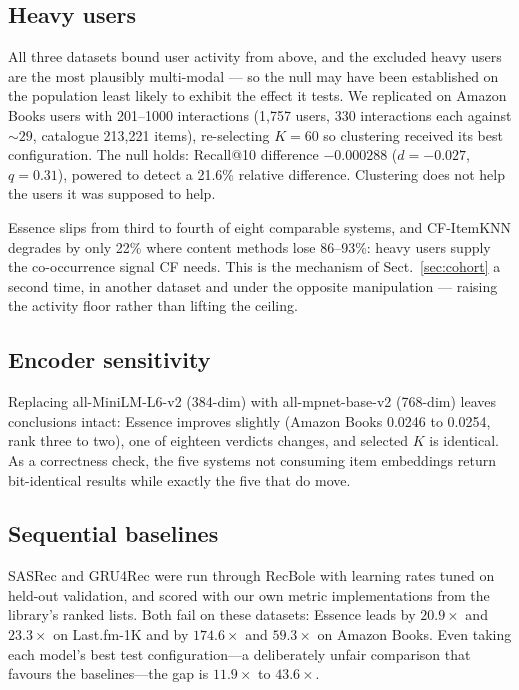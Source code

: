 \documentclass[runningheads,a4paper]{llncs}
\begin{document}
\subsection{Heavy users}\label{sec:heavy}

All three datasets bound user activity from above, and the excluded heavy users are the most
plausibly multi-modal --- so the null may have been established on the population least
likely to exhibit the effect it tests. We replicated on Amazon Books users with 201--1000
interactions (1{,}757 users, 330 interactions each against ${\sim}29$, catalogue 213{,}221
items), re-selecting $K=60$ so clustering received its best configuration. The null holds:
Recall@10 difference $-0.000288$ ($d=-0.027$, $q=0.31$), powered to detect a 21.6\%
relative difference. Clustering does not help the users it was supposed to help.

Essence slips from third to fourth of eight comparable systems, and CF-ItemKNN degrades by
only 22\% where content methods lose 86--93\%: heavy users supply the co-occurrence signal
CF needs. This is the mechanism of Sect.~\ref{sec:cohort} a second time, in another dataset
and under the opposite manipulation --- raising the activity floor rather than lifting the
ceiling.

\subsection{Encoder sensitivity}

Replacing all-MiniLM-L6-v2 (384-dim) with all-mpnet-base-v2 (768-dim) leaves conclusions
intact: Essence improves slightly (Amazon Books 0.0246 to 0.0254, rank three to two), one of
eighteen verdicts changes, and selected $K$ is identical. As a correctness check, the five
systems not consuming item embeddings return bit-identical results while exactly the five
that do move.

\subsection{Sequential baselines}\label{sec:seq}

SASRec and GRU4Rec were run through RecBole with learning rates tuned on held-out
validation, and scored with our own metric implementations from the library's ranked lists.
Both fail on these datasets: Essence leads by $20.9\times$ and $23.3\times$ on Last.fm-1K
and by $174.6\times$ and $59.3\times$ on Amazon Books. Even taking each model's
best test configuration---a deliberately unfair comparison that favours the
baselines---the gap is $11.9\times$ to $43.6\times$.
\end{document}

